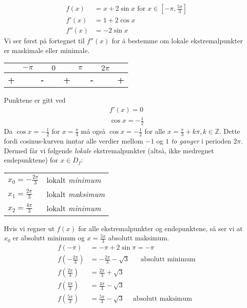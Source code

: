 \documentclass[a4paper,norsk,12pt]{article}
\begin{document}
\begin{align*}
  f(x) &= x+2\sin{x} \text{ for } x \in \left[-\pi, \frac{5\pi}{3}\right] \\
  f'(x) &= 1 + 2\cos{x} \\
  f''(x) &= -2\sin{x}
\end{align*}
Vi ser først på fortegnet til $f''(x)$ for å bestemme om lokale
ekstremalpunkter er maskimale eller minimale.
\begin{table}[h]
  \centering
\begin{tabular}{ccccccccc}
  & $-\pi$
  &
  & $0$
  &
  & $\pi$
  &
  & $2\pi$
  &
\\ \hline
    \textbf{\large{+}}
& & \textbf{\large{-}}
& & \textbf{\large{+}}
& & \textbf{\large{-}}
& & \textbf{\large{+}}
\end{tabular}
\end{table}

Punktene er gitt ved
\begin{align*}
  f'(x) = 0 \\
  \cos{x} = -\frac{1}{2}
\end{align*}
Da $\cos{x} = -\frac{1}{2}$ for $x=\frac{\pi}{3}$ må også
$\cos{x}=-\frac{1}{2}$ for alle $x = \frac{\pi}{3} + k\pi, k \in \mathbb{Z}$.
Dette fordi cosinus-kurven inntar alle verdier mellom $-1$ og $1$ \textit{to
ganger} i perioden $2\pi$. Dermed får vi følgende \textit{lokale} ekstremalpunkter
(altså, ikke medregnet endepunktene) for $x \in D_f$:
\begin{table}[h]
  \centering
  \begin{tabular}{ll}
    $x_0 = -\frac{2\pi}{3}$ & lokalt \textit{minimum} \\
    $x_1 =  \frac{2\pi}{3}$ & lokalt \textit{maksimum} \\
    $x_2 =  \frac{4\pi}{3}$ & lokalt \textit{minimum}
  \end{tabular}
\end{table}

Hvis vi regner ut $f(x)$ for alle ekstremalpunkter og endepunktene, så ser vi
at $x_0$ er absolutt minimum og $x=\frac{5\pi}{3}$ absolutt maksimum.
\begin{align*}
  f(-\pi) &= -\pi + 2\sin{\pi} = -\pi \\
  f(-\frac{2\pi}{3}) &= -\frac{2\pi}{3} - \sqrt{3} \text{~ ~  absolutt minimum} \\
  f(\frac{2\pi}{3}) &= \frac{2\pi}{3} + \sqrt{3} \\
  f(\frac{4\pi}{3}) &= \frac{4\pi}{3} - \sqrt{3} \\
  f(\frac{5\pi}{3}) &= \frac{5\pi}{3} - \sqrt{3} \text{~ ~ absolutt maksimum}
\end{align*}
\end{document}
